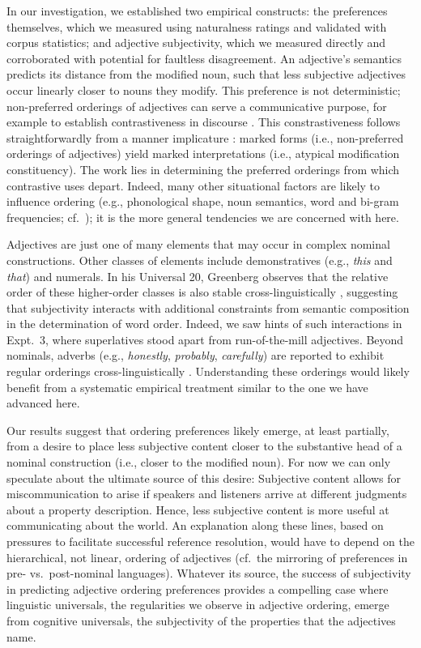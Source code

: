 \documentclass[12pt]{article}
\begin{document}
In our investigation, we established two empirical constructs: the preferences themselves, which we measured using naturalness ratings and validated with corpus statistics; and adjective subjectivity, which we measured directly and corroborated with potential for faultless disagreement. 
An adjective's semantics predicts its distance from the modified noun, such that less subjective adjectives occur linearly closer to nouns they modify. 
This preference is not deterministic; non-preferred orderings of adjectives can serve a communicative purpose, for example to establish contrastiveness in discourse \citep{martin1969,Martin1970,Hill1958,vendler1963}. This constrastiveness follows straightforwardly from a manner implicature \citep{levinson2000}: marked forms (i.e., non-preferred orderings of adjectives) yield marked interpretations (i.e., atypical modification constituency). The work lies in determining the preferred orderings from which  contrastive uses depart. Indeed, many other situational factors are likely to influence ordering (e.g., phonological shape, noun semantics, word and bi-gram frequencies; cf.~\citealp{wulff2003}); it is the more general tendencies we are concerned with here.

Adjectives are just one of many elements that may occur in complex nominal constructions. Other classes of elements include demonstratives (e.g., \emph{this} and \emph{that}) and numerals. In his Universal 20, Greenberg observes that the relative order of these higher-order classes is also stable cross-linguistically \citep{greenberg1963,Culbertson2014}, suggesting that subjectivity interacts with additional constraints from semantic composition in the determination of word order. Indeed, we saw hints of such interactions in Expt.~3, where superlatives stood apart from run-of-the-mill adjectives. Beyond nominals, adverbs (e.g., \emph{honestly}, \emph{probably}, \emph{carefully}) are reported to exhibit regular orderings cross-linguistically \citep{cinque1999,ernst2002}. Understanding these orderings would likely benefit from a systematic empirical treatment similar to the one we have advanced here.

Our results suggest that ordering preferences likely emerge, at least partially, from a desire to place less subjective content closer to the substantive head of a nominal construction (i.e., closer to the modified noun). 
For now we can only speculate about the ultimate source of this desire: Subjective content allows for miscommunication to arise if speakers and listeners arrive at different judgments about a property description. Hence, less subjective content is more useful at communicating about the world. 
An explanation along these lines, based on pressures to facilitate successful reference resolution, would have to depend on the hierarchical, not linear, ordering of adjectives (cf.~the mirroring of preferences in pre- vs.~post-nominal languages). 
Whatever its source, the success of subjectivity in predicting adjective ordering preferences provides a compelling case where linguistic universals, the regularities we observe in adjective ordering, emerge from cognitive universals, the subjectivity of the properties that the adjectives name.


   
  
\end{document}
